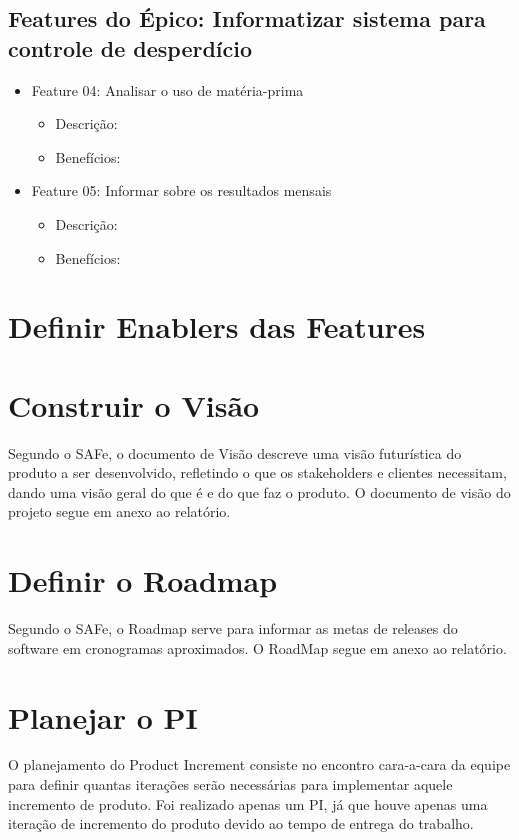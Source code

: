 \subsection{Features do Épico: Informatizar sistema para controle de desperdício}

\begin{itemize}

\item Feature 04: Analisar o uso de matéria-prima
\begin{itemize}
	\item Descrição:
	\item Benefícios:
\end{itemize}

\item Feature 05: Informar sobre os resultados mensais
\begin{itemize}
	\item Descrição:
	\item Benefícios:
\end{itemize}

\end{itemize}

\section{Definir Enablers das Features}

\section{Construir o Visão}

Segundo o SAFe, o documento de Visão descreve uma visão futurística do produto a ser desenvolvido, refletindo o que os stakeholders e clientes necessitam, dando uma visão geral do que é e do que faz o produto.
O documento de visão do projeto segue em anexo ao relatório.


\section{Definir o Roadmap}
Segundo o SAFe, o Roadmap serve para informar as metas de releases do software em cronogramas aproximados.
O RoadMap segue em anexo ao relatório.

\section{Planejar o PI}
O planejamento do Product Increment consiste no encontro cara-a-cara da equipe para definir quantas iterações serão necessárias para implementar aquele incremento de produto.
Foi realizado apenas um PI, já que houve apenas uma iteração de incremento do produto devido ao tempo de entrega do trabalho.

